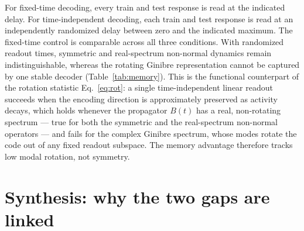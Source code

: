 \documentclass[11pt]{article}
\begin{document}
For fixed-time decoding, every train and test response is read at the indicated
delay. For time-independent decoding, each train and test response is read at an
independently randomized delay between zero and the indicated maximum. The
fixed-time control is comparable across all three conditions. With randomized
readout times, symmetric and real-spectrum non-normal dynamics remain
indistinguishable, whereas the rotating Ginibre representation cannot be
captured by one stable decoder (Table~\ref{tab:memory}). This is the functional
counterpart of the rotation statistic Eq.~\eqref{eq:rot}: a single
time-independent linear readout succeeds when the encoding direction is
approximately preserved as activity decays, which holds whenever the propagator
$B(t)$ has a real, non-rotating spectrum --- true for both the symmetric and the
real-spectrum non-normal operators --- and fails for the complex Ginibre
spectrum, whose modes rotate the code out of any fixed readout subspace. The
memory advantage therefore tracks low modal rotation, not symmetry.

\begin{table}[t]
\centering
\caption{Zero-shot accuracy (mean $\pm$ s.d., six realizations).}
\label{tab:memory}
\end{table}

\section{Synthesis: why the two gaps are linked}
\label{sec:synthesis}
\end{document}
